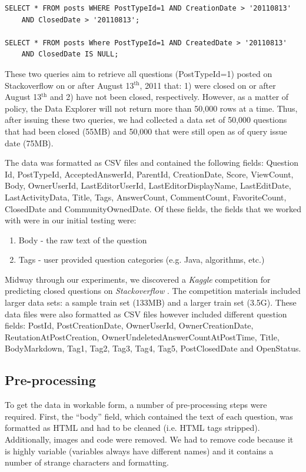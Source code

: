 \documentclass[11pt]{article}
\begin{document}
\begin{verbatim}
SELECT * FROM posts WHERE PostTypeId=1 AND CreationDate > '20110813'
    AND ClosedDate > '20110813';

SELECT * FROM posts Where PostTypeId=1 AND CreatedDate > '20110813'
    AND ClosedDate IS NULL;
\end{verbatim}

These two queries aim to retrieve all questions (PostTypeId=1) posted
on Stackoverflow on or after August 13$^{\textrm{th}}$, 2011 that: 1)
were closed on or after August 13$^{\textrm{th}}$ and 2) have not been
closed, respectively.  However, as a matter of policy, the Data
Explorer will not return more than 50,000 rows at a time.  Thus, after
issuing these two queries, we had collected a data set of 50,000
questions that had been closed (55MB) and 50,000 that were still open as of
query issue date (75MB).

The data was formatted as CSV files and contained the following
fields: Question Id, PostTypeId, AcceptedAnswerId, ParentId,
CreationDate, Score, ViewCount, Body, OwnerUserId, LastEditorUserId,
LastEditorDisplayName, LastEditDate, LastActivityData, Title, Tags,
AnswerCount, CommentCount, FavoriteCount, ClosedDate and
CommunityOwnedDate. Of these fields, the fields that we worked with
were in our initial testing were:

\begin{enumerate}
  \item Body - the raw text of the question
  \item Tags - user provided question categories (e.g. Java,
    algorithms, etc.)
\end{enumerate}

Midway through our experiments, we discovered a \emph{Kaggle}
competition for predicting closed questions on \emph{Stackoverflow}
\cite{website:kaggle}. The competition materials included larger data sets: a
sample train set (133MB) and a larger train set (3.5G).  These data
files were also formatted as CSV files however included different
question fields: PostId, PostCreationDate, OwnerUserId,
OwnerCreationDate, ReutationAtPostCreation,
OwnerUndeletedAnswerCountAtPostTime, Title, BodyMarkdown, Tag1, Tag2,
Tag3, Tag4, Tag5, PostClosedDate and OpenStatus.

\subsection{Pre-processing}
To get the data in workable form, a number of pre-processing steps
were required. First, the ``body'' field, which contained the text of
each question, was formatted as HTML and had to be
cleaned (i.e. HTML tags stripped). Additionally, images and code were
removed.  We had to remove code because it is highly variable
(variables always have different names) and it contains a number of
strange characters and formatting.
\end{document}
